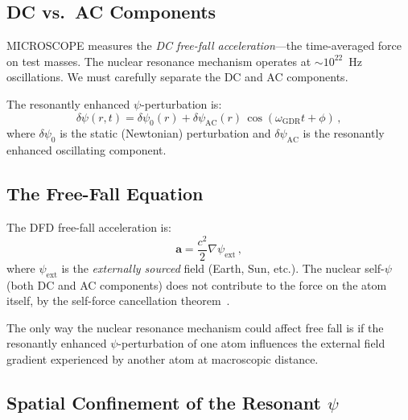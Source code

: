 \documentclass[aps,prd,twocolumn,superscriptaddress,nofootinbib]{revtex4-2}
\newcommand{\avec}{\mathbf{a}}
\newcommand{\dpsi}{\delta\psi}
\newcommand{\wGDR}{\omega_{\mathrm{GDR}}}
\begin{document}
\subsection{DC vs.\ AC Components}
\label{sec:dc-ac}

MICROSCOPE measures the \emph{DC free-fall acceleration}---the
time-averaged force on test masses.  The nuclear resonance mechanism
operates at $\sim\!10^{22}$~Hz oscillations.  We must carefully
separate the DC and AC components.

The resonantly enhanced $\psi$-perturbation is:
\begin{equation}
\dpsi(r,t) = \dpsi_0(r) + \delta\psi_{\mathrm{AC}}(r)\,
\cos(\wGDR t + \phi)\,,
\end{equation}
where $\dpsi_0$ is the static (Newtonian) perturbation and
$\delta\psi_{\mathrm{AC}}$ is the resonantly enhanced oscillating
component.

\subsection{The Free-Fall Equation}
\label{sec:freefall}

The DFD free-fall acceleration is:
\begin{equation}
\avec = \frac{c^2}{2}\nabla\psi_{\mathrm{ext}}\,,
\end{equation}
where $\psi_{\mathrm{ext}}$ is the \emph{externally sourced} field
(Earth, Sun, etc.).  The nuclear self-$\psi$ (both DC and AC
components) does not contribute to the force on the atom itself,
by the self-force cancellation theorem~\cite{Alcock2026Core}.

The only way the nuclear resonance mechanism could affect free fall
is if the resonantly enhanced $\psi$-perturbation of one atom
influences the external field gradient experienced by another atom
at macroscopic distance.

\subsection{Spatial Confinement of the Resonant $\psi$}
\label{sec:confinement}
\end{document}
